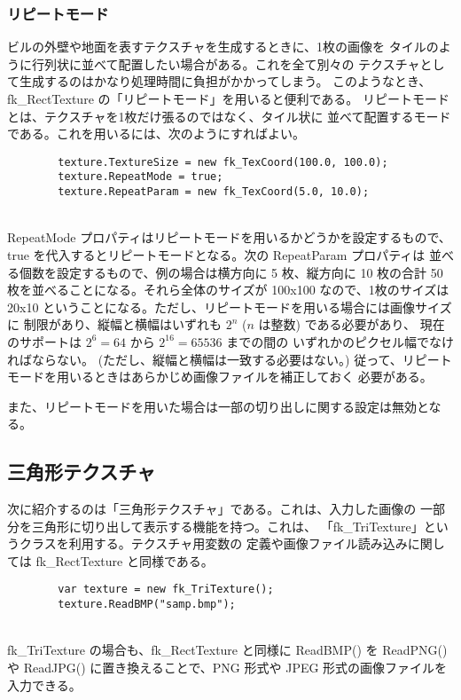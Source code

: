 \subsubsection{リピートモード}
ビルの外壁や地面を表すテクスチャを生成するときに、1枚の画像を
タイルのように行列状に並べて配置したい場合がある。これを全て別々の
テクスチャとして生成するのはかなり処理時間に負担がかかってしまう。
このようなとき、fk\_RectTexture の「リピートモード」を用いると便利である。
リピートモードとは、テクスチャを1枚だけ張るのではなく、タイル状に
並べて配置するモードである。これを用いるには、次のようにすればよい。
\\
\begin{screen}
\begin{verbatim}
        texture.TextureSize = new fk_TexCoord(100.0, 100.0);
        texture.RepeatMode = true;
        texture.RepeatParam = new fk_TexCoord(5.0, 10.0);
\end{verbatim}
\end{screen}
~ \\
RepeatMode プロパティはリピートモードを用いるかどうかを設定するもので、
true を代入するとリピートモードとなる。次の RepeatParam プロパティは
並べる個数を設定するもので、例の場合は横方向に 5 枚、縦方向に 10 枚の合計
50 枚を並べることになる。それら全体のサイズが 100x100 なので、1枚のサイズは
20x10 ということになる。ただし、リピートモードを用いる場合には画像サイズに
制限があり、縦幅と横幅はいずれも \(2^n\) (\(n\) は整数) である必要があり、
現在のサポートは \(2^{6} = 64\) から \(2^{16} = 65536\) までの間の
いずれかのピクセル幅でなければならない。
(ただし、縦幅と横幅は一致する必要はない。)
従って、リピートモードを用いるときはあらかじめ画像ファイルを補正しておく
必要がある。

また、リピートモードを用いた場合は一部の切り出しに関する設定は無効となる。

\subsection{三角形テクスチャ}
次に紹介するのは「三角形テクスチャ」である。これは、入力した画像の
一部分を三角形に切り出して表示する機能を持つ。これは、
「fk\_TriTexture」というクラスを利用する。テクスチャ用変数の
定義や画像ファイル読み込みに関しては fk\_RectTexture と同様である。
\\
\begin{screen}
\begin{verbatim}
        var texture = new fk_TriTexture();
        texture.ReadBMP("samp.bmp");
\end{verbatim}
\end{screen}
~ \\
fk\_TriTexture の場合も、fk\_RectTexture と同様に ReadBMP() を
ReadPNG() や ReadJPG() に置き換えることで、PNG 形式や JPEG 形式の画像ファイルを入力できる。

